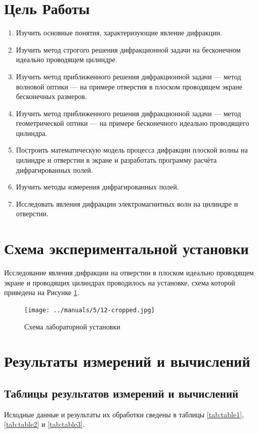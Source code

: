 \documentclass[10pt,a4paper,oneside, reqno]{amsproc}
\begin{document}
\section{Цель Работы}
\begin{enumerate}
    \item Изучить основные понятия, характеризующие явление дифракции.\\
    \item Изучить метод строгого решения дифракционной задачи на бесконечном идеально проводящем цилиндре.\\
    \item Изучить метод приближенного решения дифракционной задачи --- метод волновой оптики --- на примере
          отверстия в плоском проводящем экране бесконечных размеров.\\
    \item Изучить метод приближенного решения дифракционной задачи --- метод геометрической оптики --- на 
          примере бесконечного идеально проводящего цилиндра.\\
    \item Построить математическую модель процесса дифракции плоской волны на цилиндре и отверстии в экране
          и разработать программу расчёта дифрагированных полей.\\
    \item Изучить методы измерения дифрагированных полей.\\
    \item Исследовать явления дифракции электромагнитных волн на цилиндре и отверстии.
\end{enumerate}
\section{Схема экспериментальной установки}
Исследование явления дифракции на отверстии в плоском идеально проводящем экране и проводящих цилиндрах 
проводилось на установке, схема которой приведена на Рисунке \ref{fig:scheme}.
\begin{figure}[h!t]
    \texttt{[image: ../manuals/5/12-cropped.jpg]}
    \caption{Схема лабораторной установки}
    \label{fig:scheme}
\end{figure}
\newpage
\section{Результаты измерений и вычислений}
\subsection{Таблицы результатов измерений и вычислений}
Исходные данные и результаты их обработки сведены в таблицы \ref{tab:table1}, \ref{tab:table2} и \ref{tab:table3}.\\
\end{document}
